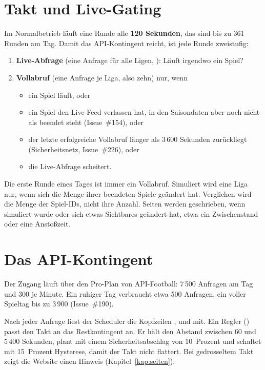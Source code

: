 \section{Takt und Live-Gating}

Im Normalbetrieb läuft eine Runde alle \textbf{120 Sekunden}, das sind bis
zu 361 Runden am Tag. Damit das API-Kontingent reicht, ist jede Runde zweistufig:

\begin{enumerate}
  \item \textbf{Live-Abfrage} (eine Anfrage für alle Ligen,
        ): Läuft irgendwo ein Spiel?
  \item \textbf{Vollabruf} (eine Anfrage je Liga, also zehn) nur, wenn
        \begin{itemize}
          \item ein Spiel läuft, oder
          \item ein Spiel den Live-Feed verlassen hat, in den Saisondaten aber
                noch nicht als beendet steht (Issue~\#154), oder
          \item der letzte erfolgreiche Vollabruf länger als 3\,600 Sekunden
                zurückliegt (Sicherheitsnetz, Issue~\#226), oder
          \item die Live-Abfrage scheitert.
        \end{itemize}
\end{enumerate}

Die erste Runde eines Tages ist immer ein Vollabruf. Simuliert wird eine
Liga nur, wenn sich die Menge ihrer beendeten Spiele geändert hat. Verglichen
wird die Menge der Spiel-IDs, nicht ihre Anzahl. Seiten werden geschrieben,
wenn simuliert wurde oder sich etwas Sichtbares geändert hat, etwa ein
Zwischenstand oder eine Anstoßzeit.

\section{Das API-Kontingent}

Der Zugang läuft über den Pro-Plan von API-Football: 7\,500 Anfragen am Tag
und 300 je Minute. Ein ruhiger Tag verbraucht etwa 500 Anfragen, ein voller
Spieltag bis zu 3\,900 (Issue~\#190).

Nach jeder Anfrage liest der Scheduler die Kopfzeilen
,  und  mit.
Ein Regler () passt den Takt an das
Restkontingent an. Er hält den Abstand zwischen 60 und 5\,400 Sekunden,
plant mit einem Sicherheitsabschlag von 10~Prozent und schaltet mit 15~Prozent
Hysterese, damit der Takt nicht flattert. Bei gedrosseltem Takt zeigt die
Website einen Hinweis (Kapitel~\ref{kap:seiten}).

